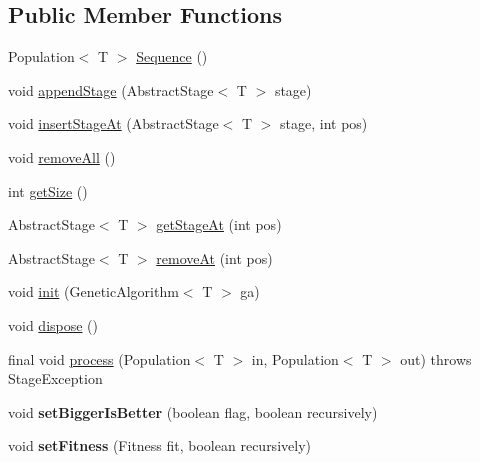 \subsection*{Public Member Functions}
\begin{DoxyCompactItemize}
\item 
Population$<$ T $>$ \hyperlink{classjenes_1_1stage_1_1_sequence_3_01_t_01extends_01_chromosome_01_4_a8d41af628fe9c1e2fdf4be3c9938a172}{Sequence} ()
\item 
void \hyperlink{classjenes_1_1stage_1_1_sequence_3_01_t_01extends_01_chromosome_01_4_a7d0e59aeed366cb6f71f754f61bfceb3}{append\-Stage} (Abstract\-Stage$<$ T $>$ stage)
\item 
void \hyperlink{classjenes_1_1stage_1_1_sequence_3_01_t_01extends_01_chromosome_01_4_a922e6363fc19620738e95ddfc649ea6e}{insert\-Stage\-At} (Abstract\-Stage$<$ T $>$ stage, int pos)
\item 
void \hyperlink{classjenes_1_1stage_1_1_sequence_3_01_t_01extends_01_chromosome_01_4_ab020311ac8fad8d6d884df9634c211b8}{remove\-All} ()
\item 
int \hyperlink{classjenes_1_1stage_1_1_sequence_3_01_t_01extends_01_chromosome_01_4_af16f419e9be758779fa14cf53f31bfe1}{get\-Size} ()
\item 
Abstract\-Stage$<$ T $>$ \hyperlink{classjenes_1_1stage_1_1_sequence_3_01_t_01extends_01_chromosome_01_4_aa9e1d97737fed4c5141cda315c216b32}{get\-Stage\-At} (int pos)
\item 
Abstract\-Stage$<$ T $>$ \hyperlink{classjenes_1_1stage_1_1_sequence_3_01_t_01extends_01_chromosome_01_4_a1336b162d37aaa9b402c49480d12f8ef}{remove\-At} (int pos)
\item 
void \hyperlink{classjenes_1_1stage_1_1_sequence_3_01_t_01extends_01_chromosome_01_4_a98d9ad6e0fdc1547971fe7fce029e25f}{init} (Genetic\-Algorithm$<$ T $>$ ga)
\item 
void \hyperlink{classjenes_1_1stage_1_1_sequence_3_01_t_01extends_01_chromosome_01_4_a4faf3479fa76eef530633ce8339971e5}{dispose} ()
\item 
final void \hyperlink{classjenes_1_1stage_1_1_sequence_3_01_t_01extends_01_chromosome_01_4_adc0e7397edd44839ef221122db3696e8}{process} (Population$<$ T $>$ in, Population$<$ T $>$ out)  throws Stage\-Exception 
\item 
\hypertarget{classjenes_1_1stage_1_1_sequence_3_01_t_01extends_01_chromosome_01_4_a759a03c3336352cc390b2024afcc2ab1}{void {\bfseries set\-Bigger\-Is\-Better} (boolean flag, boolean recursively)}\label{classjenes_1_1stage_1_1_sequence_3_01_t_01extends_01_chromosome_01_4_a759a03c3336352cc390b2024afcc2ab1}

\item 
\hypertarget{classjenes_1_1stage_1_1_sequence_3_01_t_01extends_01_chromosome_01_4_a1ec43e74c2534861caf2475405869853}{void {\bfseries set\-Fitness} (Fitness fit, boolean recursively)}\label{classjenes_1_1stage_1_1_sequence_3_01_t_01extends_01_chromosome_01_4_a1ec43e74c2534861caf2475405869853}

\end{DoxyCompactItemize}



